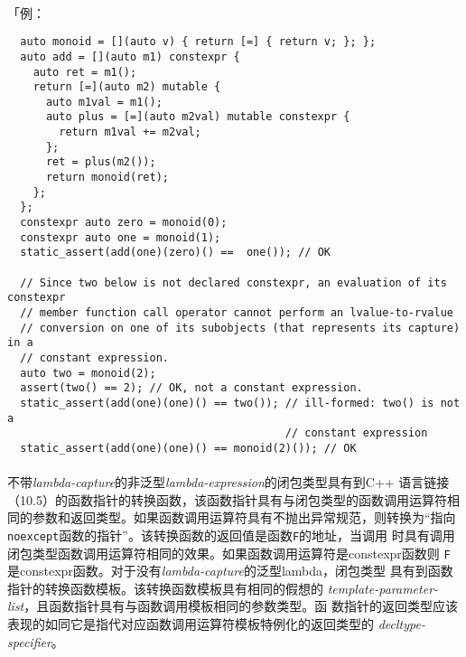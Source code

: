 \paragraph{}
「例：
\begin{lstlisting}
  auto monoid = [](auto v) { return [=] { return v; }; };
  auto add = [](auto m1) constexpr {
    auto ret = m1();
    return [=](auto m2) mutable {
      auto m1val = m1();
      auto plus = [=](auto m2val) mutable constexpr {
        return m1val += m2val;
      };
      ret = plus(m2());
      return monoid(ret);
    };
  };
  constexpr auto zero = monoid(0);
  constexpr auto one = monoid(1);
  static_assert(add(one)(zero)() ==  one()); // OK

  // Since two below is not declared constexpr, an evaluation of its constexpr
  // member function call operator cannot perform an lvalue-to-rvalue
  // conversion on one of its subobjects (that represents its capture) in a
  // constant expression.
  auto two = monoid(2);
  assert(two() == 2); // OK, not a constant expression.
  static_assert(add(one)(one)() == two()); // ill-formed: two() is not a
                                           // constant expression
  static_assert(add(one)(one)() == monoid(2)()); // OK
\end{lstlisting}

\paragraph{}
不带\textit{lambda-capture}的非泛型\textit{lambda-expression}的闭包类型具有到C++
语言链接（10.5）的函数指针的转换函数，该函数指针具有与闭包类型的函数调用运算符相
同的参数和返回类型。如果函数调用运算符具有不抛出异常规范，则转换为``指向
\texttt{noexcept}函数的指针''。该转换函数的返回值是函数\texttt{F}的地址，当调用
时具有调用闭包类型函数调用运算符相同的效果。如果函数调用运算符是constexpr函数则
\texttt{F}是constexpr函数。对于没有\textit{lambda-capture}的泛型lambda，闭包类型
具有到函数指针的转换函数模板。该转换函数模板具有相同的假想的
\textit{template-parameter-list}，且函数指针具有与函数调用模板相同的参数类型。函
数指针的返回类型应该表现的如同它是指代对应函数调用运算符模板特例化的返回类型的
\textit{decltype-specifier}。


